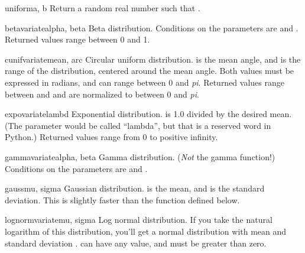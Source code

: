 \begin{funcdesc}{uniform}{a, b}
  Return a random real number  such that
  .
\end{funcdesc}

\begin{funcdesc}{betavariate}{alpha, beta}
  Beta distribution.  Conditions on the parameters are
   and .
  Returned values range between 0 and 1.
\end{funcdesc}

\begin{funcdesc}{cunifvariate}{mean, arc}
  Circular uniform distribution.   is the mean angle, and
   is the range of the distribution, centered around the mean
  angle.  Both values must be expressed in radians, and can range
  between 0 and \emph{pi}.  Returned values range between
   and  and are normalized to between 0 and \emph{pi}.

\end{funcdesc}

\begin{funcdesc}{expovariate}{lambd}
  Exponential distribution.   is 1.0 divided by the desired
  mean.  (The parameter would be called ``lambda'', but that is a
  reserved word in Python.)  Returned values range from 0 to
  positive infinity.
\end{funcdesc}

\begin{funcdesc}{gammavariate}{alpha, beta}
  Gamma distribution.  (\emph{Not} the gamma function!)  Conditions on
  the parameters are  and .
\end{funcdesc}

\begin{funcdesc}{gauss}{mu, sigma}
  Gaussian distribution.   is the mean, and  is the
  standard deviation.  This is slightly faster than the
   function defined below.
\end{funcdesc}

\begin{funcdesc}{lognormvariate}{mu, sigma}
  Log normal distribution.  If you take the natural logarithm of this
  distribution, you'll get a normal distribution with mean 
  and standard deviation .   can have any value,
  and  must be greater than zero.
\end{funcdesc}


